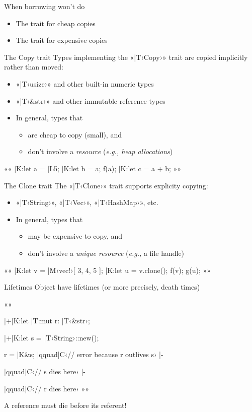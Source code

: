 \documentclass{beamer}
\begin{document}
\begin{frame}{When borrowing won't do}{}
  \begin{itemize}
    \item The  trait for cheap copies
    \item The  trait for expensive copies
  \end{itemize}
\end{frame}

\begin{frame}[fragile]{The Copy trait}{}
  Types implementing the «|T‹Copy›» trait are copied implicitly rather
  than moved:
  \begin{itemize}
    \item «|T‹usize›» and other built-in numeric types
    \item «|T‹&str›» and other immutable reference types
    \item In general, types that
      \begin{itemize}
        \item are cheap to copy (small), and
        \item don't involve a \emph{resource} (\emph{e.g., heap
          allocations})
      \end{itemize}
  \end{itemize}

  ««
  |K:let a = |L5;
  |K:let b = a;
  f(a);
  |K:let c = a + b;
  »»
\end{frame}

\begin{frame}[fragile]{The Clone trait}{}
  The «|T‹Clone›» trait supports explicity copying:
  \begin{itemize}
    \item «|T‹String›», «|T‹Vec›», «|T‹HashMap›», etc.
    \item In general, types that
      \begin{itemize}
        \item may be expensive to copy, and
        \item don't involve a \emph{unique resource}
          (\emph{e.g.,} a file handle)
      \end{itemize}
  \end{itemize}

  ««
  |K:let v = |M‹vec!›[ 3, 4, 5 ];
  |K:let u = v.clone();
  f(v);
  g(u);
  »»
\end{frame}

\begin{frame}[fragile]{Lifetimes}
  Object have lifetimes (or more precisely, death times)

  ««
  {
  	|+|K:let |T:mut r: |T‹&str›;

    {
    	|+|K:let s = |T‹String›::new();

      r = |K&s; |qquad|C‹// error because r outlives s› |-
    } |qquad|C‹// s dies here› |-
  } |qquad|C‹// r dies here›
  »»

  \pause
  A reference must die before its referent!
\end{frame}
\end{document}
